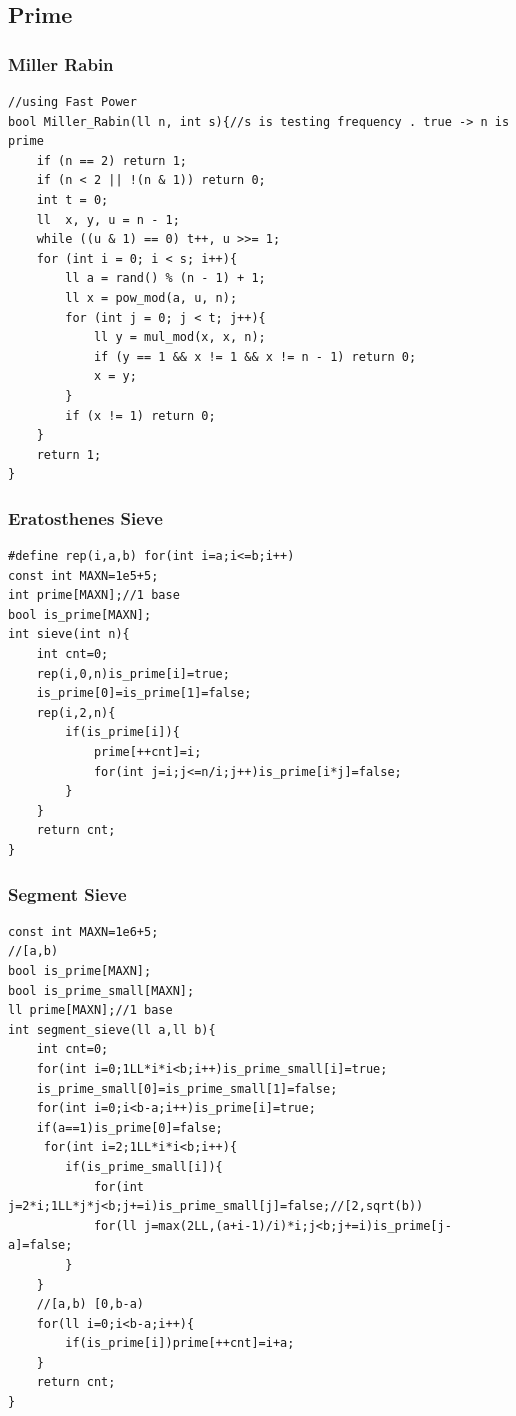 \documentclass[twoside]{article}
\begin{document}
\subsection{Prime}
\subsubsection{Miller Rabin}
\begin{lstlisting}
//using Fast Power	
bool Miller_Rabin(ll n, int s){//s is testing frequency . true -> n is prime 	
    if (n == 2) return 1;	
    if (n < 2 || !(n & 1)) return 0;	
    int t = 0;	
    ll  x, y, u = n - 1;	
    while ((u & 1) == 0) t++, u >>= 1;	
    for (int i = 0; i < s; i++){	
        ll a = rand() % (n - 1) + 1;	
        ll x = pow_mod(a, u, n);	
        for (int j = 0; j < t; j++){	
            ll y = mul_mod(x, x, n);	
            if (y == 1 && x != 1 && x != n - 1) return 0;	
            x = y;	
        }	
        if (x != 1) return 0;	
    }	
    return 1;	
}
\end{lstlisting}
\subsubsection{Eratosthenes Sieve}
\begin{lstlisting}
#define rep(i,a,b) for(int i=a;i<=b;i++)
const int MAXN=1e5+5;
int prime[MAXN];//1 base
bool is_prime[MAXN];
int sieve(int n){
    int cnt=0;
    rep(i,0,n)is_prime[i]=true;
    is_prime[0]=is_prime[1]=false;
    rep(i,2,n){
        if(is_prime[i]){
            prime[++cnt]=i;
            for(int j=i;j<=n/i;j++)is_prime[i*j]=false;
        }
    }
    return cnt;
}

\end{lstlisting}
\subsubsection{Segment Sieve}
\begin{lstlisting}
const int MAXN=1e6+5;	
//[a,b)	
bool is_prime[MAXN];	
bool is_prime_small[MAXN];	
ll prime[MAXN];//1 base	
int segment_sieve(ll a,ll b){	
    int cnt=0;	
    for(int i=0;1LL*i*i<b;i++)is_prime_small[i]=true;	
    is_prime_small[0]=is_prime_small[1]=false;	
    for(int i=0;i<b-a;i++)is_prime[i]=true;	
    if(a==1)is_prime[0]=false;	
     for(int i=2;1LL*i*i<b;i++){	
        if(is_prime_small[i]){	
            for(int j=2*i;1LL*j*j<b;j+=i)is_prime_small[j]=false;//[2,sqrt(b))	
            for(ll j=max(2LL,(a+i-1)/i)*i;j<b;j+=i)is_prime[j-a]=false;	
        }	
    }	
    //[a,b) [0,b-a)	
    for(ll i=0;i<b-a;i++){	
        if(is_prime[i])prime[++cnt]=i+a;	
    }	
    return cnt;	
}
\end{lstlisting}
\end{document}
